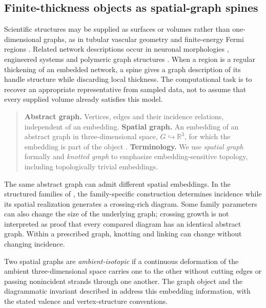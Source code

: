 \subsection{Finite-thickness objects as spatial-graph spines}
\label{supp:handlebody_basis}
Scientific structures may be supplied as surfaces or volumes rather than one-dimensional graphs, as in tubular vascular geometry \cite{kg_aylward2005spatial_vascular} and finite-energy Fermi regions \cite{akgun_yan_2026topologicalclassificationknottedgraphs}. Related network descriptions occur in neuronal morphologies \cite{kg_cuntz2010neuronal_graphs}, engineered systems \cite{kg_shai1999engineering_graphs,kg_peddada2023} and polymeric graph structures \cite{kg_deguchi2017topological_polymers}. When a region is a regular thickening of an embedded network, a spine gives a graph description of its handle structure while discarding local thickness. The computational task is to recover an appropriate representative from sampled data, not to assume that every supplied volume already satisfies this model.

\begin{quote}
\textbf{Abstract graph.} Vertices, edges and their incidence relations, independent of an embedding.
\medskip
\noindent\textbf{Spatial graph.} An embedding of an abstract graph in three-dimensional space, $G\hookrightarrow\mathbb R^3$, for which the embedding is part of the object \cite{kg_kauffman1989spatial,kg_flapan2017spatial}.
\medskip
\noindent\textbf{Terminology.} We use \emph{spatial graph} formally and \emph{knotted graph} to emphasize embedding-sensitive topology, including topologically trivial embeddings.
\end{quote}

The same abstract graph can admit different spatial embeddings. In the structured families of , the family-specific construction determines incidence while its spatial realization generates a crossing-rich diagram. Some family parameters can also change the size of the underlying graph; crossing growth is not interpreted as proof that every compared diagram has an identical abstract graph. Within a prescribed graph, knotting and linking can change without changing incidence.

Two spatial graphs are \emph{ambient-isotopic} if a continuous deformation of the ambient three-dimensional space carries one to the other without cutting edges or passing nonincident strands through one another. The graph object and the diagrammatic invariant described in  address this embedding information, with the stated valence and vertex-structure conventions.

